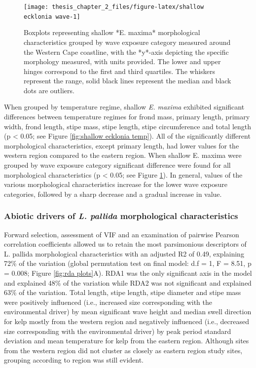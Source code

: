 \documentclass[
  a4paper,
]{article}
\begin{document}
\begin{figure}

{\centering \texttt{[image: thesis\_chapter\_2\_files/figure-latex/shallow ecklonia wave-1]} 

}

\caption{\label{fig:shallow ecklonia wave}Boxplots representing shallow *E. maxima* morphological characteristics grouped by wave exposure category measured around the Western Cape coastline, with the *y*-axis depicting the specific morphology measured, with units provided. The lower and upper hinges correspond to the first and third quartiles. The whiskers represent the range, solid black lines represent the median and black dots are outliers.}\label{fig:shallow ecklonia wave}
\end{figure}

When grouped by temperature regime, shallow \emph{E. maxima} exhibited
significant differences between temperature regimes for frond mass,
primary length, primary width, frond length, stipe mass, stipe length,
stipe circumference and total length (p \textless{} 0.05; see Figure
\ref{fig:shallow ecklonia temp}). All of the significantly different
morphological characteristics, except primary length, had lower values
for the western region compared to the eastern region. When shallow E.
maxima were grouped by wave exposure category significant difference
were found for all morphological characteristics (p \textless{} 0.05;
see Figure \ref{fig:shallow ecklonia wave}). In general, values of the
various morphological characteristics increase for the lower wave
exposure categories, followed by a sharp decrease and a gradual increase
in value.

\hypertarget{abiotic-drivers-of-l.-pallida-morphological-characteristics}{%
\subsubsection{\texorpdfstring{Abiotic drivers of \emph{L. pallida}
morphological
characteristics}{Abiotic drivers of L. pallida morphological characteristics}}\label{abiotic-drivers-of-l.-pallida-morphological-characteristics}}

Forward selection, assessment of VIF and an examination of pairwise
Pearson correlation coefficients allowed us to retain the most
parsimonious descriptors of L. pallida morphological characteristics
with an adjusted R2 of 0.49, explaining 72\% of the variation (global
permutation test on final model: d.f = 1, F = 8.51, p = 0.008; Figure
\ref{fig:rda plots}A). RDA1 was the only significant axis in the model
and explained 48\% of the variation while RDA2 was not significant and
explained 63\% of the variation. Total length, stipe length, stipe
diameter and stipe mass were positively influenced (i.e., increased size
corresponding with the environmental driver) by mean significant wave
height and median swell direction for kelp mostly from the western
region and negatively influenced (i.e., decreased size corresponding
with the environmental driver) by peak period standard deviation and
mean temperature for kelp from the eastern region. Although sites from
the western region did not cluster as closely as eastern region study
sites, grouping according to region was still evident.
\end{document}
